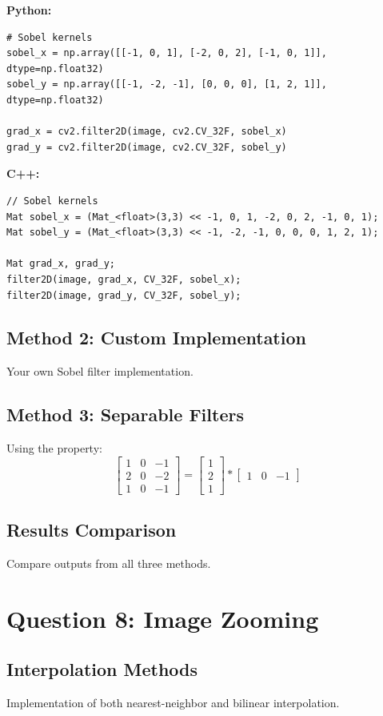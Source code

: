 \documentclass[12pt]{article}
\begin{document}
\textbf{Python:}
\begin{lstlisting}[style=pythonstyle]
# Sobel kernels
sobel_x = np.array([[-1, 0, 1], [-2, 0, 2], [-1, 0, 1]], dtype=np.float32)
sobel_y = np.array([[-1, -2, -1], [0, 0, 0], [1, 2, 1]], dtype=np.float32)

grad_x = cv2.filter2D(image, cv2.CV_32F, sobel_x)
grad_y = cv2.filter2D(image, cv2.CV_32F, sobel_y)
\end{lstlisting}

\textbf{C++:}
\begin{lstlisting}[style=cppstyle]
// Sobel kernels
Mat sobel_x = (Mat_<float>(3,3) << -1, 0, 1, -2, 0, 2, -1, 0, 1);
Mat sobel_y = (Mat_<float>(3,3) << -1, -2, -1, 0, 0, 0, 1, 2, 1);

Mat grad_x, grad_y;
filter2D(image, grad_x, CV_32F, sobel_x);
filter2D(image, grad_y, CV_32F, sobel_y);
\end{lstlisting}

\subsection{Method 2: Custom Implementation}
Your own Sobel filter implementation.

\subsection{Method 3: Separable Filters}
Using the property:
\[
\begin{bmatrix} 1 & 0 & -1 \\ 2 & 0 & -2 \\ 1 & 0 & -1 \end{bmatrix} 
= \begin{bmatrix} 1 \\ 2 \\ 1 \end{bmatrix} * \begin{bmatrix} 1 & 0 & -1 \end{bmatrix}
\]

\subsection{Results Comparison}
Compare outputs from all three methods.

\section{Question 8: Image Zooming}
\subsection{Interpolation Methods}
Implementation of both nearest-neighbor and bilinear interpolation.
\end{document}
